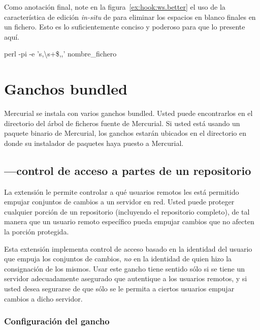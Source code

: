 Como anotación final, note en la figura~\ref{ex:hook:ws.better} el
uso de la característica de edición \emph{in-situ} de 
para eliminar los espacios en blanco finales en un fichero. Esto es
lo suficientemente conciso y poderoso para que lo presente aquí.
\begin{codesample2}
    perl -pi -e 's,\textbackslash{}s+\$,,' nombre\_fichero
\end{codesample2}

\section{Ganchos bundled}

Mercurial se instala con varios ganchos bundled. Usted puede
encontrarlos en el directorio  del árbol de ficheros
fuente de Mercurial. Si usted está usando un paquete binario de
Mercurial, los ganchos estarán ubicados en el directorio
 en donde su instalador de paquetes haya puesto a
Mercurial.

\subsection{---control de acceso a partes de un repositorio}

La extensión  le permite controlar a qué usuarios remotos
les está permitido empujar conjuntos de cambios a un servidor en red.
Usted puede proteger cualquier porción de un repositorio (incluyendo
el repositorio completo), de tal manera que un usuario remoto
específico pueda empujar cambios que no afecten la porción protegida.

Esta extensión implementa control de acceso basado en la identidad del
usuario que empuja los conjuntos de cambios, \emph{no} en la identidad
de quien hizo la consignación de los mismos. Usar este gancho tiene
sentido sólo si se tiene un servidor adecuadamente asegurado que
autentique a los usuarios remotos, y si usted desea segurarse de que
sólo se le permita a ciertos usuarios empujar cambios a dicho
servidor.

\subsubsection{Configuración del gancho }

